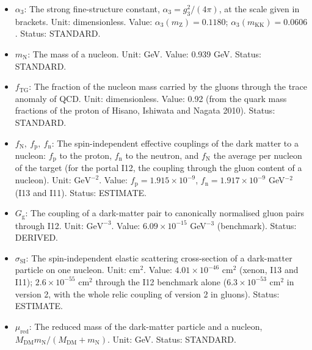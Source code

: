 \documentclass[
  10pt,
]{article}
\begin{document}
\begin{itemize}
  \(\pi\): The number pi, the ratio of the circumference of a circle to
  its diameter. Unit: dimensionless. Value: 3.141592654. Status:
  STANDARD.
\item
  \(\alpha_3\): The strong fine-structure constant,
  \(\alpha_3 = g_3^2/(4\pi)\), at the scale given in brackets. Unit:
  dimensionless. Value: \(\alpha_3(m_{\mathrm{Z}}) = 0.1180\);
  \(\alpha_3(m_{\mathrm{KK}}) = 0.0606\). Status: STANDARD.
\item
  \(m_{\mathrm{N}}\): The mass of a nucleon. Unit: GeV. Value: 0.939
  GeV. Status: STANDARD.
\item
  \(f_{\mathrm{TG}}\): The fraction of the nucleon mass carried by the
  gluons through the trace anomaly of QCD. Unit: dimensionless. Value:
  0.92 (from the quark mass fractions of the proton of Hisano, Ishiwata
  and Nagata 2010). Status: STANDARD.
\item
  \(f_{\mathrm{N}},\ f_{\mathrm{p}},\ f_{\mathrm{n}}\): The
  spin-independent effective couplings of the dark matter to a nucleon:
  \(f_{\mathrm{p}}\) to the proton, \(f_{\mathrm{n}}\) to the neutron,
  and \(f_{\mathrm{N}}\) the average per nucleon of the target (for the
  portal I12, the coupling through the gluon content of a nucleon).
  Unit: \(\mathrm{GeV}^{-2}\). Value:
  \(f_{\mathrm{p}} = 1.915\times10^{-9}\),
  \(f_{\mathrm{n}} = 1.917\times10^{-9}\) GeV\(^{-2}\) (I13 and I11).
  Status: ESTIMATE.
\item
  \(G_{\mathrm{g}}\): The coupling of a dark-matter pair to canonically
  normalised gluon pairs through I12. Unit: \(\mathrm{GeV}^{-3}\).
  Value: \(6.09\times10^{-15}\) GeV\(^{-3}\) (benchmark). Status:
  DERIVED.
\item
  \(\sigma_{\mathrm{SI}}\): The spin-independent elastic scattering
  cross-section of a dark-matter particle on one nucleon. Unit:
  \(\mathrm{cm}^2\). Value: \(4.01\times10^{-46}\) cm\(^2\) (xenon, I13
  and I11); \(2.6\times10^{-55}\) cm\(^2\) through the I12 benchmark
  alone (\(6.3\times10^{-53}\) cm\(^2\) in version 2, with the whole
  relic coupling of version 2 in gluons). Status: ESTIMATE.
\item
  \(\mu_{\mathrm{red}}\): The reduced mass of the dark-matter particle
  and a nucleon,
  \(M_{\mathrm{DM}}m_{\mathrm{N}}/(M_{\mathrm{DM}} + m_{\mathrm{N}})\).
  Unit: GeV. Status: STANDARD.
\end{itemize}
\end{document}
